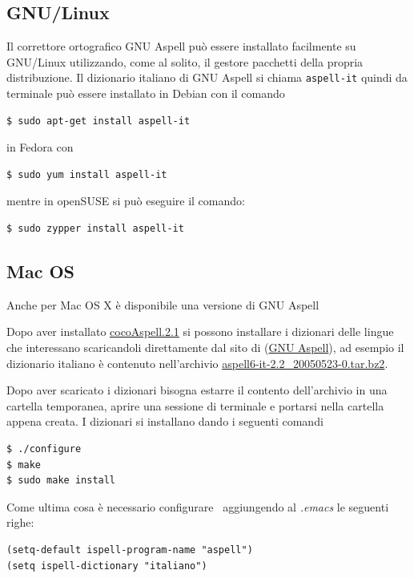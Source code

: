 \documentclass[11pt,a4paper]{article}
\begin{document}
\subsection{GNU/Linux}
\label{sec:aspelllinux}

Il correttore ortografico GNU Aspell può essere installato facilmente
su GNU/Linux utilizzando, come al solito, il gestore pacchetti della
propria distribuzione. Il dizionario italiano di GNU Aspell si chiama
\texttt{aspell-it} quindi da terminale può essere installato in Debian
con il comando
\begin{Verbatim}
$ sudo apt-get install aspell-it
\end{Verbatim}
in Fedora con
\begin{Verbatim}
$ sudo yum install aspell-it
\end{Verbatim}
mentre in openSUSE si può eseguire il comando:
\begin{Verbatim}
$ sudo zypper install aspell-it
\end{Verbatim}

\subsection{Mac OS}
\label{sec:aspellmac}

Anche per Mac OS X è disponibile una versione di \textsf{GNU Aspell}

Dopo aver installato \href{http://people.ict.usc.edu/~leuski/%
  cocoaspell/cocoAspell.2.1.dmg}{cocoAspell.2.1} si possono installare
i dizionari delle lingue che interessano scaricandoli direttamente dal
sito di (\href{ftp://ftp.gnu.org/gnu/aspell/dict/}{\textsf{GNU
    Aspell}}), ad esempio il dizionario italiano è contenuto
nell'archivio
\href{ftp://ftp.gnu.org/gnu/aspell/dict/it/aspell6-it-2.2_20050523-0.tar.bz2}%
{aspell6-it-2.2\_20050523-0.tar.bz2}.

Dopo aver scaricato i dizionari bisogna estarre il contento
dell'archivio in una cartella temporanea, aprire una sessione di
terminale e portarsi nella cartella appena creata. I dizionari si
installano dando i seguenti comandi
\begin{Verbatim}
$ ./configure
$ make
$ sudo make install
\end{Verbatim}

Come ultima cosa è necessario configurare \emacs\ aggiungendo al
\emph{.emacs} le seguenti righe:
\begin{Verbatim}
(setq-default ispell-program-name "aspell")
(setq ispell-dictionary "italiano")
\end{Verbatim}
\end{document}
